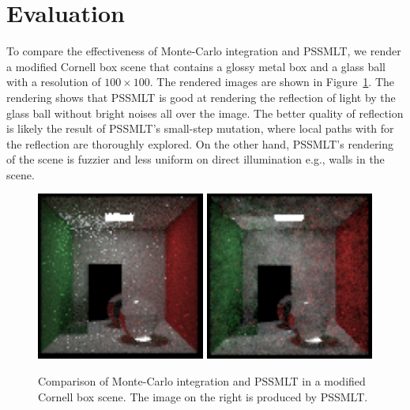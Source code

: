 \documentclass{article}
\begin{document}
\section{Evaluation}

To compare the effectiveness of Monte-Carlo integration and PSSMLT, we render a modified Cornell box scene that contains a glossy metal box and a glass ball with a resolution of $100 \times 100$. The rendered images are shown in Figure~\ref{fig:monte-carlo}. The rendering shows that PSSMLT is good at rendering the reflection of light by the glass ball without bright noises all over the image. The better quality of reflection is likely the result of PSSMLT's small-step mutation, where local paths with for the reflection are thoroughly explored. On the other hand, PSSMLT's rendering of the scene is fuzzier and less uniform on direct illumination e.g., walls in the scene.

\begin{figure}
    \centering
    \includegraphics{monte-carlo.pdf}
    \includegraphics{pssmlt.pdf}
    \caption{Comparison of Monte-Carlo integration and PSSMLT in a modified Cornell box scene. The image on the right is produced by PSSMLT.}
    \label{fig:monte-carlo}
\end{figure}


\printbibliography
\end{document}
